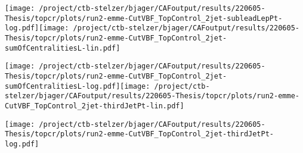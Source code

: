 \documentclass{article}
\begin{document}
\texttt{[image: /project/ctb-stelzer/bjager/CAFoutput/results/220605-Thesis/topcr/plots/run2-emme-CutVBF\_TopControl\_2jet-subleadLepPt-log.pdf]}\texttt{[image: /project/ctb-stelzer/bjager/CAFoutput/results/220605-Thesis/topcr/plots/run2-emme-CutVBF\_TopControl\_2jet-sumOfCentralitiesL-lin.pdf]}

\texttt{[image: /project/ctb-stelzer/bjager/CAFoutput/results/220605-Thesis/topcr/plots/run2-emme-CutVBF\_TopControl\_2jet-sumOfCentralitiesL-log.pdf]}\texttt{[image: /project/ctb-stelzer/bjager/CAFoutput/results/220605-Thesis/topcr/plots/run2-emme-CutVBF\_TopControl\_2jet-thirdJetPt-lin.pdf]}

\texttt{[image: /project/ctb-stelzer/bjager/CAFoutput/results/220605-Thesis/topcr/plots/run2-emme-CutVBF\_TopControl\_2jet-thirdJetPt-log.pdf]}
\end{document}
